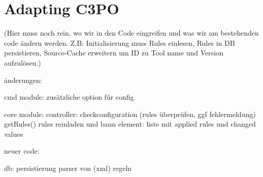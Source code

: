 \documentclass[a4paper,12pt]{article}
\begin{document}
\section{Adapting C3PO}
(Hier muss noch rein, wo wir in den Code eingreifen und was wir am bestehenden code ändern werden. Z.B: Initialisierung muss Rules einlesen, Rules in DB persistieren, Source-Cache erweitern um ID zu Tool name und Version aufzulösen.)

änderungen:

cmd module: 
	zusätzliche option für config

core module: 
	controller: 
		checkconfiguration (rules überprüfen, ggf fehlermeldung)
		getRules() rules reinladen und baun
	element:
		liste mit applied rules und changed values
		
neuer code:

	db:
		persistierung
		parser von (xml) regeln
\end{document}
